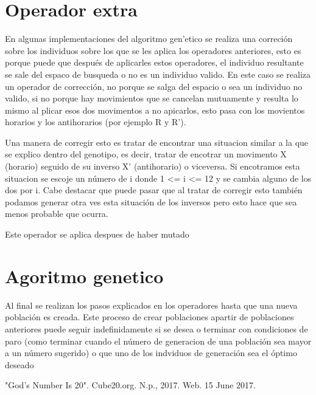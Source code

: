 \documentclass[oneside,10pt]{article}
\begin{document}
\section{Operador extra}
En algunas implementaciones del algoritmo gen'etico se realiza una correci\'on sobre los individuos sobre los que se les aplica los operadores anteriores, esto es porque puede que despu\'es de aplicarles estos operadores, el individuo resultante se sale del espaco de busqueda o no es un individuo valido. En este caso se realiza un operador de correcci\'on, no porque se salga del espacio o sea un individuo no valido, si no porque hay movimientos que se cancelan mutuamente y resulta lo mismo al plicar esos dos movimentos a no apicarlos, esto pasa con los movientos horarios y los antihorarios (por ejemplo R y R').

Una manera de corregir esto es tratar de encontrar una situacion similar a la que se explico dentro del genotipo, es decir, tratar de encotrar un movimento X (horario) seguido de su inverso X' (antihorario) o viceversa. Si encotramos esta situacion se escoje un n\'umero de i donde 1 <= i <= 12 y se cambia alguno de los dos por i. Cabe destacar que puede pasar que al tratar de corregir esto tambi\'en podamos generar otra ves esta situaci\'on de los inversos pero esto hace que sea menos probable que ocurra.

Este operador se aplica despues de haber mutado
\section{Agoritmo genetico}
Al final se realizan los pasos explicados en los operadores hasta que una nueva poblaci\'on es creada. Este proceso de crear poblaciones apartir de poblaciones anteriores puede seguir indefinidamente si se desea o terminar con condiciones de paro (como terminar cuando el n\'umero de generacion de una poblaci\'on sea mayor a un n\'umero sugerido) o que uno de los indviduos de generaci\'on sea el \'optimo deseado
\begin{thebibliography}{99}
 "God's Number Is 20". Cube20.org. N.p., 2017. Web. 15 June 2017.


\end{thebibliography}
\end{document}
